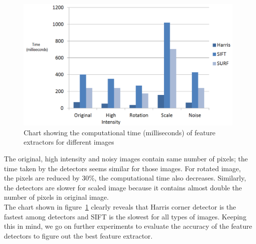 \begin{figure}[H]%
\centering
\includegraphics[width=\columnwidth]{2.mainmatter/2.Methodology/FeaturesExtraction/figures/features-CT}%
\caption[Comparison: Computational Time]{Chart showing the computational time (milliseconds) of feature extractors for different images}%
\label{fig:feature-computational-time}%
\end{figure}

\noindent The original, high intensity and noisy images contain same number of pixels; the time taken by the detectors seems similar for those images. For rotated image, the pixels are reduced by 30\%, the computational time also decreases. Similarly, the detectors are slower for scaled image because it contains almost double the number of pixels in original image.\\

\noindent The chart shown in figure~\ref{fig:feature-computational-time} clearly reveals that Harris corner detector is the fastest among detectors and SIFT is the slowest for all types of images. Keeping this in  mind, we go on further experiments to evaluate the accuracy of the feature detectors to figure out the best feature extractor.


